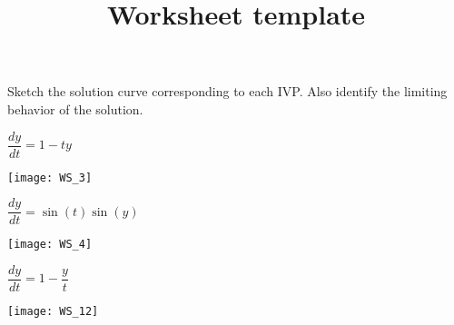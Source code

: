 \documentclass[12pt]{exam}
\title{Worksheet template}
\begin{document}
\bigskip
\bigskip

Sketch the solution curve corresponding to each IVP.  Also identify the limiting behavior of the solution.
\begin{questions}
    
\question
$\dfrac{dy}{dt} = 1 -ty$
\bigskip
\begin{multicols}{2}
\texttt{[image: WS\_3]}
\end{multicols}

\bigskip
\bigskip

\question
$\dfrac{dy}{dt} = \sin(t) \sin(y)$
\bigskip
\begin{multicols}{2}
\texttt{[image: WS\_4]}
\end{multicols}

\clearpage

\question
$\dfrac{dy}{dt} = 1 - \dfrac{y}{t}$
\bigskip
\begin{multicols}{2}
\texttt{[image: WS\_12]}
\end{multicols}

\end{questions}
\end{document}
